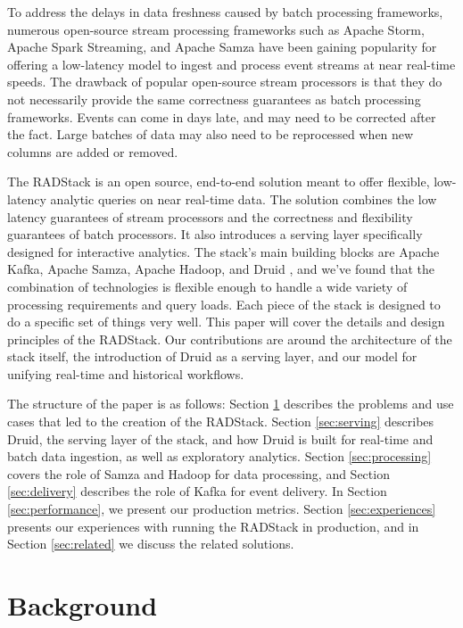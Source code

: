 \documentclass{vldb}
\begin{document}
To address the delays in data freshness caused by batch processing
frameworks, numerous open-source stream processing frameworks such as Apache
Storm\cite{marz2013storm}, Apache Spark Streaming\cite{zaharia2012discretized},
and Apache Samza\cite{2014samza} have been gaining popularity for offering a
low-latency model to ingest and process event streams at near real-time speeds.
The drawback of popular open-source stream processors is that they do not
necessarily provide the same correctness guarantees as batch processing
frameworks. Events can come in days late, and may need to be corrected after
the fact. Large batches of data may also need to be reprocessed when new
columns are added or removed.

The RADStack is an open source, end-to-end solution meant to offer flexible,
low-latency analytic queries on near real-time data. The solution combines the
low latency guarantees of stream processors and the correctness and flexibility
guarantees of batch processors. It also introduces a serving layer specifically
designed for interactive analytics. The stack’s main building blocks are Apache
Kafka\cite{kreps2011kafka}, Apache Samza, Apache Hadoop, and Druid
\cite{yang2014druid}, and we’ve found that the combination of technologies is
flexible enough to handle a wide variety of processing requirements and query
loads. Each piece of the stack is designed to do a specific set of things very
well. This paper will cover the details and design principles of the RADStack.
Our contributions are around the architecture of the stack itself, the
introduction of Druid as a serving layer, and our model for unifying real-time
and historical workflows.

The structure of the paper is as follows: Section \ref{sec:background}
describes the problems and use cases that led to the creation of the RADStack.
Section \ref{sec:serving} describes Druid, the serving layer of the stack, and
how Druid is built for real-time and batch data ingestion, as well as
exploratory analytics. Section \ref{sec:processing} covers the role of Samza
and Hadoop for data processing, and Section \ref{sec:delivery} describes the
role of Kafka for event delivery. In Section \ref{sec:performance}, we present
our production metrics.  Section \ref{sec:experiences} presents our experiences
with running the RADStack in production, and in Section \ref{sec:related} we
discuss the related solutions.

\section{Background}
\label{sec:background}
\end{document}
